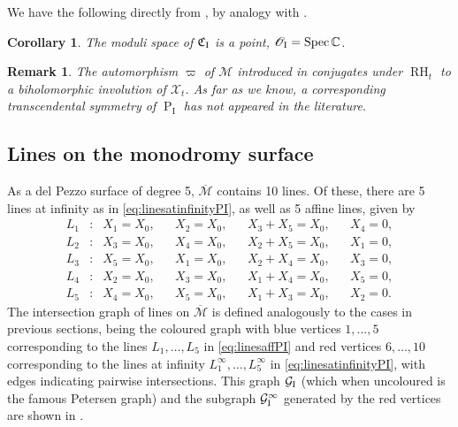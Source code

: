 \documentclass[a4paper,reqno]{amsart}
\numberwithin{equation}{section}
\newcommand{\C}{\mathbb{C}}
\newcommand{\pain}[1]{\operatorname{P}_{\mathrm{#1}}}
\newtheorem{remark}[theorem]{Remark}
\newtheorem{corollary}[theorem]{Corollary}
\numberwithin{equation}{section}
\begin{document}
We have the following directly from , by analogy with .
\begin{corollary} \label{cor:modulispacePI}
    The moduli space of $\mathfrak{C}_{\rm{I}}$ is a point, $\mathscr{O}_{\rm{I}}=\operatorname{Spec} \C$.
\end{corollary}

\begin{remark} \label{rem:mysterysymmetryPI}
    The automorphism $\varpi$ of $\mathcal{M}$ introduced in  conjugates under $\operatorname{RH}_{t}$ to a biholomorphic involution of $\mathcal{X}_{t}$. 
    As far as we know, a corresponding transcendental symmetry of $\pain{I}$ has not appeared in the literature.
\end{remark}

\subsection{Lines on the monodromy surface}


As a del Pezzo surface of degree 5, $\overline{\mathcal{M}}$ contains 10 lines.
Of these, there are 5 lines at infinity as in \eqref{eq:linesatinfinityPI},
as well as 5 affine lines, given by 
\begin{equation} \label{eq:linesaffPI}
    \begin{aligned}
        L_{1} &: & X_1 = X_0 ,& &X_2 = X_0 ,& & X_3+X_5 = X_0 ,& &X_4= 0,\\
        L_{2} &: & X_3 = X_0 ,& &X_4 = X_0 ,& & X_2+X_5 = X_0 ,& &X_1= 0,\\
        L_{3} &: & X_5 = X_0,& &X_1 = X_0 ,& & X_2+X_4 = X_0 ,& &X_3= 0,\\
        L_{4} &: & X_2 = X_0 ,& &X_3 = X_0 ,& & X_1+X_4 = X_0 ,& &X_5= 0,\\
        L_{5} &: & X_4 = X_0 ,& &X_5 = X_0 ,& & X_1+X_3 = X_0 ,& &X_2= 0.
    \end{aligned}
\end{equation}
The intersection graph of lines on $\overline{\mathcal{M}}$ is defined analogously to the cases in previous sections, being the coloured graph with blue vertices $1,\dots,5$ corresponding to the lines $L_1,\dots,L_5$ in \cref{eq:linesaffPI} and red vertices $6,\dots,10$ corresponding to the lines at infinity $L_{1}^{\infty},\dots,L_5^{\infty}$ in \cref{eq:linesatinfinityPI}, with edges indicating pairwise intersections. This graph $\mathcal{G}_{\rm{I}}$ (which when uncoloured is the famous Petersen graph) and the subgraph $\mathcal{G}_{\rm{I}}^{\infty}$ generated by the red vertices are shown in .
\end{document}
